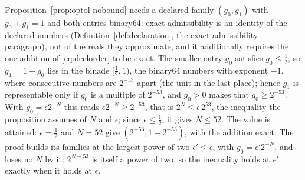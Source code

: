 
\begin{remark}\label{rem:representability-ceiling}
Proposition~\ref{prop:optol-nobound} needs a declared family $(g_0,g_1)$
with $g_0+g_1=1$ and both entries binary64: exact admissibility is an
identity of the declared numbers (Definition~\ref{def:declaration}, the
exact-admissibility paragraph), not of the reals they approximate, and it
additionally requires the one addition of \eqref{eq:declorder} to be
exact. The smaller entry $g_0$ satisfies $g_0\le\tfrac12$, so
$g_1=1-g_0$ lies in the binade $[\tfrac12,1)$, the binary64 numbers with
exponent $-1$, where consecutive numbers are $2^{-53}$ apart (the unit in
the last place); hence $g_1$ is representable only if $g_0$ is a multiple
of $2^{-53}$, and $g_0>0$ makes that $g_0\ge2^{-53}$. With
$g_0=\epsilon2^{-N}$ this reads $\epsilon2^{-N}\ge2^{-53}$, that is
$2^{N}\le\epsilon\,2^{53}$, the inequality the proposition assumes of
$N$ and $\epsilon$; since $\epsilon\le\tfrac12$, it gives $N\le52$. The
value is attained: $\epsilon=\tfrac12$ and $N=52$ give
$(2^{-53},1-2^{-53})$, with the addition exact. The proof builds its
families at the largest power of two $\epsilon'\le\epsilon$, with
$g_0=\epsilon'2^{-N}$, and loses no $N$ by it: $2^{N-53}$ is itself a
power of two, so the inequality holds at $\epsilon'$ exactly when it
holds at $\epsilon$.


\end{remark}
